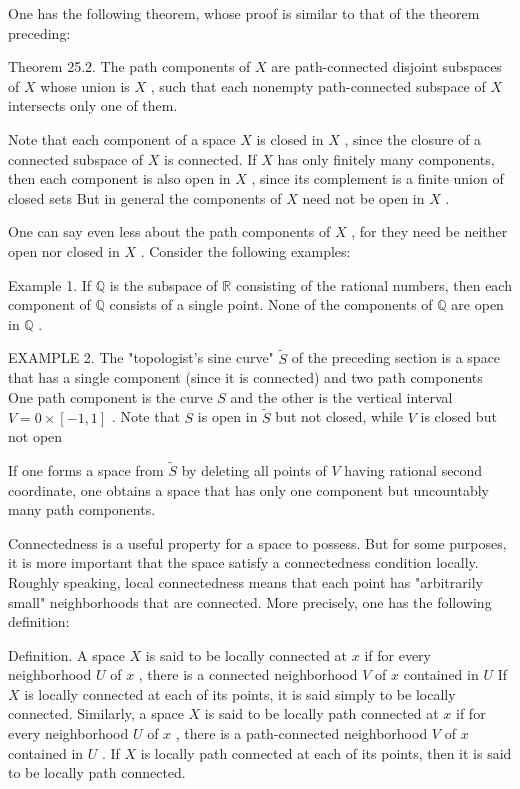 \documentclass[10pt]{article}
\begin{document}
One has the following theorem, whose proof is similar to that of the theorem preceding:

Theorem 25.2. The path components of \(X\) are path-connected disjoint subspaces of \(X\) whose union is \(X\) , such that each nonempty path-connected subspace of \(X\) intersects only one of them.

Note that each component of a space \(X\) is closed in \(X\) , since the closure of a connected subspace of \(X\) is connected. If \(X\) has only finitely many components, then each component is also open in \(X\) , since its complement is a finite union of closed sets But in general the components of \(X\) need not be open in \(X\) .

One can say even less about the path components of \(X\) , for they need be neither open nor closed in \(X\) . Consider the following examples:

Example 1. If \(\mathbb{Q}\) is the subspace of \(\mathbb{R}\) consisting of the rational numbers, then each component of \(\mathbb{Q}\) consists of a single point. None of the components of \(\mathbb{Q}\) are open in \(\mathbb{Q}\) .

EXAMPLE 2. The "topologist’s sine curve" \(\widetilde{S}\) of the preceding section is a space that has a single component (since it is connected) and two path components One path component is the curve \(S\) and the other is the vertical interval \(V = 0 \times  \left\lbrack  {-1,1}\right\rbrack\) . Note that \(S\) is open in \(\widetilde{S}\) but not closed, while \(V\) is closed but not open

If one forms a space from \(\widetilde{S}\) by deleting all points of \(V\) having rational second coordinate, one obtains a space that has only one component but uncountably many path components.

Connectedness is a useful property for a space to possess. But for some purposes, it is more important that the space satisfy a connectedness condition locally. Roughly speaking, local connectedness means that each point has "arbitrarily small" neighborhoods that are connected. More precisely, one has the following definition:

Definition. A space \(X\) is said to be locally connected at \(x\) if for every neighborhood \(U\) of \(x\) , there is a connected neighborhood \(V\) of \(x\) contained in \(U\) If \(X\) is locally connected at each of its points, it is said simply to be locally connected. Similarly, a space \(X\) is said to be locally path connected at \(x\) if for every neighborhood \(U\) of \(x\) , there is a path-connected neighborhood \(V\) of \(x\) contained in \(U\) . If \(X\) is locally path connected at each of its points, then it is said to be locally path connected.
\end{document}
